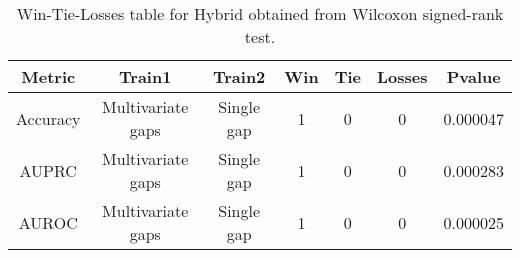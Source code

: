 \begin{table}[H]
\centering
\begin{tabular}{|c|c|c|c|c|c|c|}

\textbf{Metric} &    \textbf{Train1} & \textbf{Train2} &  \textbf{Win} &  \textbf{Tie} &  \textbf{Losses} &  \textbf{Pvalue} \\
\hline

       Accuracy &  Multivariate gaps &      Single gap &             1 &             0 &                0 &         0.000047 \\
\hline
          AUPRC &  Multivariate gaps &      Single gap &             1 &             0 &                0 &         0.000283 \\
\hline
          AUROC &  Multivariate gaps &      Single gap &             1 &             0 &                0 &         0.000025 \\
\hline

\end{tabular}
\caption{Win-Tie-Losses table for Hybrid obtained from Wilcoxon signed-rank test.}
\label{tab:hybrid_training_data_comparison}
\end{table}